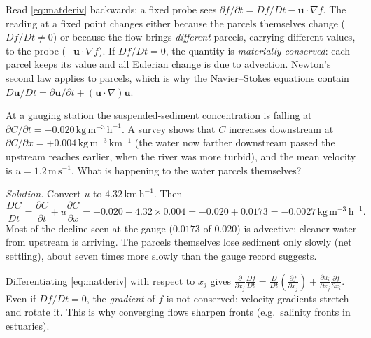 \documentclass[11pt,letterpaper]{article}
\numberwithin{equation}{section}
\newcommand{\uu}{\mathbf{u}}
\newcommand{\pd}[2]{\frac{\partial #1}{\partial #2}}
\newcommand{\Dt}[1]{\frac{D #1}{Dt}}
\newcommand{\units}[1]{\,\mathrm{#1}}
\begin{document}
\begin{keyidea}
Read \eqref{eq:matderiv} backwards: a fixed probe sees $\partial f/\partial t = Df/Dt-\uu\cdot\nabla f$.
The reading at a fixed point changes either because the parcels themselves change ($Df/Dt\neq0$) or because
the flow brings \emph{different} parcels, carrying different values, to the probe ($-\uu\cdot\nabla f$).
If $Df/Dt=0$, the quantity is \emph{materially conserved}: each parcel keeps its value and all Eulerian change
is due to advection. Newton's second law applies to parcels, which is why the Navier--Stokes equations contain
$D\uu/Dt=\partial\uu/\partial t+(\uu\cdot\nabla)\uu$.
\end{keyidea}

\begin{worked}\label{we:gauge}
At a gauging station the suspended-sediment concentration is falling at
$\partial C/\partial t=-0.020\units{kg\,m^{-3}\,h^{-1}}$. A survey shows that $C$ increases downstream at
$\partial C/\partial x=+0.004\units{kg\,m^{-3}\,km^{-1}}$ (the water now farther downstream passed the upstream reaches
earlier, when the river was more turbid), and the mean velocity is
$u=1.2\units{m\,s^{-1}}$. What is happening to the water parcels themselves?

\emph{Solution.} Convert $u$ to $4.32\units{km\,h^{-1}}$. Then
\[
\Dt{C}=\pd{C}{t}+u\pd{C}{x}=-0.020+4.32\times0.004=-0.020+0.0173=-0.0027\units{kg\,m^{-3}\,h^{-1}}.
\]
Most of the decline seen at the gauge ($0.0173$ of $0.020$) is advective: cleaner water from upstream is
arriving. The parcels themselves lose sediment only slowly (net settling), about seven times more slowly than the
gauge record suggests.
\end{worked}

\begin{pitfall}
Differentiating \eqref{eq:matderiv} with respect to $x_j$ gives
$\displaystyle \pd{}{x_j}\Dt{f}=\Dt{}\!\left(\pd{f}{x_j}\right)+\pd{u_i}{x_j}\pd{f}{x_i}$.
Even if $Df/Dt=0$, the \emph{gradient} of $f$ is not conserved: velocity gradients stretch and rotate it.
This is why converging flows sharpen fronts (e.g.\ salinity fronts in estuaries).
\end{pitfall}
\end{document}
